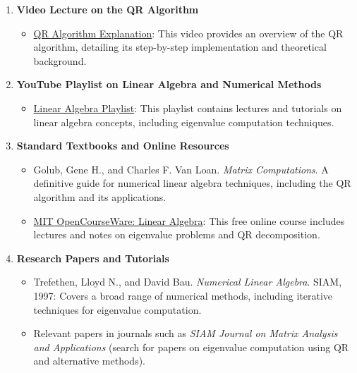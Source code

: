 \documentclass[12pt]{article}
\begin{document}
\begin{enumerate}
    \item \textbf{Video Lecture on the QR Algorithm}
    \begin{itemize}
        \item \href{https://youtu.be/pOiOH3yESPM?si=aDqNwa7yemUeFxbM}{QR Algorithm Explanation}: This video provides an overview of the QR algorithm, detailing its step-by-step implementation and theoretical background.
    \end{itemize}

    \item \textbf{YouTube Playlist on Linear Algebra and Numerical Methods}
    \begin{itemize}
        \item \href{https://youtube.com/playlist?list=PLxKgD50sMRvBHxvNPnGQ1kEHlO5y7mSnh&si=-t8-K6JNHG8CjlA5}{Linear Algebra Playlist}: This playlist contains lectures and tutorials on linear algebra concepts, including eigenvalue computation techniques.
    \end{itemize}

    \item \textbf{Standard Textbooks and Online Resources}
    \begin{itemize}
        \item Golub, Gene H., and Charles F. Van Loan. \textit{Matrix Computations}. A definitive guide for numerical linear algebra techniques, including the QR algorithm and its applications.
        \item \href{https://ocw.mit.edu/courses/mathematics/18-06-linear-algebra-spring-2010/}{MIT OpenCourseWare: Linear Algebra}: This free online course includes lectures and notes on eigenvalue problems and QR decomposition.
    \end{itemize}

    \item \textbf{Research Papers and Tutorials}
    \begin{itemize}
        \item Trefethen, Lloyd N., and David Bau. \textit{Numerical Linear Algebra}. SIAM, 1997: Covers a broad range of numerical methods, including iterative techniques for eigenvalue computation.
        \item Relevant papers in journals such as \textit{SIAM Journal on Matrix Analysis and Applications} (search for papers on eigenvalue computation using QR and alternative methods).
    \end{itemize}
\end{enumerate}
\end{document}
